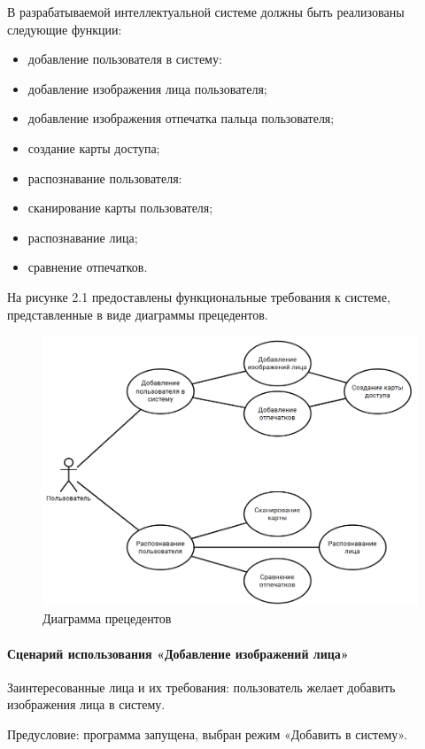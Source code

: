 В разрабатываемой интеллектуальной системе должны
быть реализованы следующие функции: 
\begin{itemize}
	\item добавление пользователя в систему:
   	\item добавление изображения лица пользователя;
    \item добавление изображения отпечатка пальца пользователя;
    \item создание карты доступа;
    \item распознавание пользователя:
	\item сканирование карты пользователя;
	\item распознавание лица;
	\item сравнение отпечатков.
\end{itemize}

На рисунке 2.1 предоставлены функциональные требования к системе,
представленные в виде диаграммы прецедентов.
\begin{figure}[H]
	\centering
	\includegraphics[width=1\linewidth]{images/UML}
	\caption{Диаграмма прецедентов}
	\label{fig:uml}
\end{figure}

\paragraph{Сценарий использования «Добавление изображений лица»}

Заинтересованные лица и их требования: пользователь желает добавить изображения лица в систему.

Предусловие: программа запущена, выбран режим «Добавить в систему».

